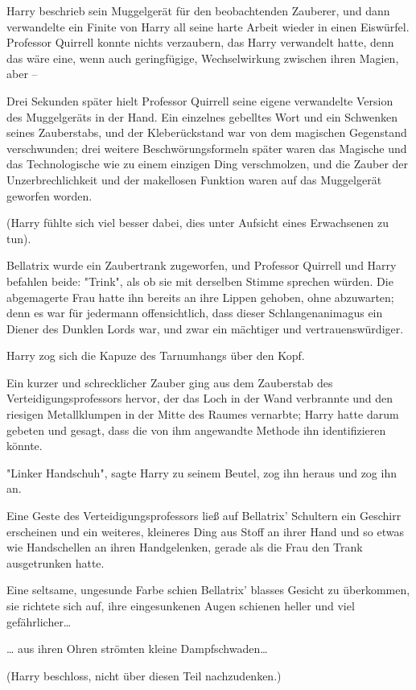 {Harry beschrieb sein Muggelgerät für den beobachtenden Zauberer, und dann verwandelte ein Finite von Harry all seine harte Arbeit wieder in einen Eiswürfel. Professor Quirrell konnte nichts verzaubern, das Harry verwandelt hatte, denn das wäre eine, wenn auch geringfügige, Wechselwirkung zwischen ihren Magien, aber --

Drei Sekunden später hielt Professor Quirrell seine eigene verwandelte Version des Muggelgeräts in der Hand. Ein einzelnes gebelltes Wort und ein Schwenken seines Zauberstabs, und der Kleberückstand war von dem magischen Gegenstand verschwunden; drei weitere Beschwörungsformeln später waren das Magische und das Technologische wie zu einem einzigen Ding verschmolzen, und die Zauber der Unzerbrechlichkeit und der makellosen Funktion waren auf das Muggelgerät geworfen worden.

(Harry fühlte sich viel besser dabei, dies unter Aufsicht eines Erwachsenen zu tun).

Bellatrix wurde ein Zaubertrank zugeworfen, und Professor Quirrell und Harry befahlen beide: "Trink", als ob sie mit derselben Stimme sprechen würden. Die abgemagerte Frau hatte ihn bereits an ihre Lippen gehoben, ohne abzuwarten; denn es war für jedermann offensichtlich, dass dieser Schlangenanimagus ein Diener des Dunklen Lords war, und zwar ein mächtiger und vertrauenswürdiger.

Harry zog sich die Kapuze des Tarnumhangs über den Kopf.

Ein kurzer und schrecklicher Zauber ging aus dem Zauberstab des Verteidigungsprofessors hervor, der das Loch in der Wand verbrannte und den riesigen Metallklumpen in der Mitte des Raumes vernarbte; Harry hatte darum gebeten und gesagt, dass die von ihm angewandte Methode ihn identifizieren könnte.

"Linker Handschuh", sagte Harry zu seinem Beutel, zog ihn heraus und zog ihn an.

Eine Geste des Verteidigungsprofessors ließ auf Bellatrix' Schultern ein Geschirr erscheinen und ein weiteres, kleineres Ding aus Stoff an ihrer Hand und so etwas wie Handschellen an ihren Handgelenken, gerade als die Frau den Trank ausgetrunken hatte.

Eine seltsame, ungesunde Farbe schien Bellatrix' blasses Gesicht zu überkommen, sie richtete sich auf, ihre eingesunkenen Augen schienen heller und viel gefährlicher…

… aus ihren Ohren strömten kleine Dampfschwaden…

(Harry beschloss, nicht über diesen Teil nachzudenken.)

}
